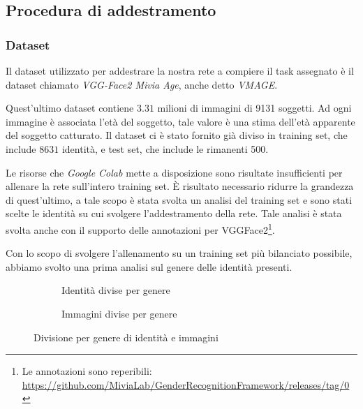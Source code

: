 \subsection{Procedura di addestramento}
\subsubsection{Dataset}
\label{subsubsec:dataset}

Il dataset utilizzato per addestrare la nostra rete a compiere il task assegnato è il dataset chiamato \emph{VGG-Face2 Mivia Age}, anche detto \emph{VMAGE}\cite{miviaage}.

Quest'ultimo dataset contiene $3.31$ milioni di immagini di 9131 soggetti. Ad ogni immagine è associata l'età del soggetto, tale valore è una stima dell'età apparente del soggetto catturato.
Il dataset ci è stato fornito già diviso in training set, che include $8631$ identità, e test set, che include le rimanenti 500.

 Le risorse che \textit{Google Colab} mette a disposizione sono risultate insufficienti per allenare la rete sull'intero training set. È risultato necessario ridurre la grandezza di quest'ultimo, a tale scopo è stata svolta un analisi del training set e sono stati scelte le identità su cui svolgere l'addestramento della rete. Tale analisi è stata svolta anche con il supporto delle annotazioni per VGGFace2\footnote{Le annotazioni sono reperibili: \url{https://github.com/MiviaLab/GenderRecognitionFramework/releases/tag/0}}.

Con lo scopo di svolgere l'allenamento su un training set più bilanciato possibile, abbiamo svolto una prima analisi sul genere delle identità presenti.

\begin{figure}[H]

\begin{subfigure}{0.5\textwidth}
\def\svgscale{0.5}

\caption{Identità divise per genere}
\label{sfig:Ids per gender}
\end{subfigure}
\begin{subfigure}{0.5\textwidth}
\def\svgscale{0.5}

\caption{Immagini divise per genere}
\label{sfig:Images per gender}
\end{subfigure}
\caption{Divisione per genere di identità e immagini}
\label{fig:gender_division}
\end{figure}

